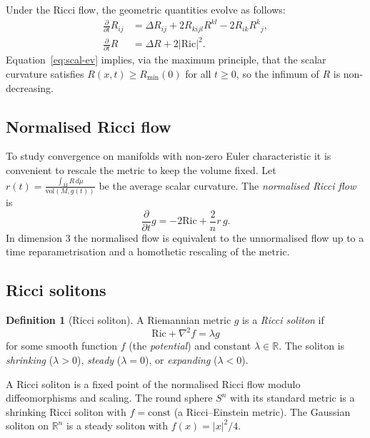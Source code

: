\documentclass[12pt,a4paper]{amsart}
\theoremstyle{definition}
\newtheorem{definition}[theorem]{Definition}
\theoremstyle{remark}
\newcommand{\R}{\mathbb{R}}
\newcommand{\Ric}{\mathrm{Ric}}
\newcommand{\vol}{\mathrm{vol}}
\begin{document}
Under the Ricci flow, the geometric quantities evolve as follows:
\begin{align}
  \frac{\partial}{\partial t} R_{ij} &= \Delta R_{ij} + 2 R_{kijl}R^{kl}
     - 2 R_{ik}R^k{}_j, \label{eq:ric-ev} \\
  \frac{\partial}{\partial t} R &= \Delta R + 2|\Ric|^2. \label{eq:scal-ev}
\end{align}
Equation~\eqref{eq:scal-ev} implies, via the maximum principle, that the
scalar curvature satisfies $R(x,t) \geq R_{\min}(0)$ for all $t \geq 0$, so
the infimum of $R$ is non-decreasing.

\subsection{Normalised Ricci flow}

To study convergence on manifolds with non-zero Euler characteristic it is
convenient to rescale the metric to keep the volume fixed.  Let
$r(t) = \frac{\int_M R\,d\mu}{\vol(M,g(t))}$ be the average scalar curvature.
The \emph{normalised Ricci flow} is
\begin{equation}
  \label{eq:nrf}
  \frac{\partial}{\partial t} g = -2\Ric + \frac{2}{n} r\, g.
\end{equation}
In dimension $3$ the normalised flow is equivalent to the unnormalised flow up
to a time reparametrisation and a homothetic rescaling of the metric.

\subsection{Ricci solitons}

\begin{definition}[Ricci soliton]
A Riemannian metric $g$ is a \emph{Ricci soliton} if
\[
  \Ric + \nabla^2 f = \lambda g
\]
for some smooth function $f$ (the \emph{potential}) and constant
$\lambda \in \R$.  The soliton is \emph{shrinking} ($\lambda > 0$),
\emph{steady} ($\lambda = 0$), or \emph{expanding} ($\lambda < 0$).
\end{definition}

A Ricci soliton is a fixed point of the normalised Ricci flow modulo
diffeomorphisms and scaling.  The round sphere $S^n$ with its standard metric
is a shrinking Ricci soliton with $f = \mathrm{const}$ (a Ricci--Einstein
metric).  The Gaussian soliton on $\R^n$ is a steady soliton with
$f(x) = |x|^2/4$.


\end{document}
